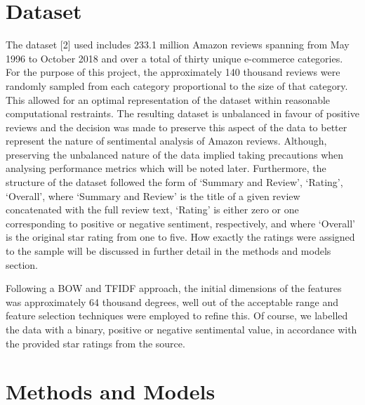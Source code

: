 \documentclass[conference]{IEEEtran}
\begin{document}
\section{Dataset}

	The dataset [2] used includes 233.1 million Amazon reviews spanning from May 1996 to October 2018 and over a total of thirty unique e-commerce categories. For the purpose of this project, the approximately 140 thousand reviews were randomly sampled from each category proportional to the size of that category. This allowed for an optimal representation of the dataset within reasonable computational restraints. The resulting dataset is unbalanced in favour of positive reviews and the decision was made to preserve this aspect of the data to better represent the nature of sentimental analysis of Amazon reviews. Although, preserving the unbalanced nature of the data implied taking precautions when analysing performance metrics which will be noted later. Furthermore, the structure of the dataset followed the form of {‘Summary and Review’, ‘Rating’, ‘Overall’}, where ‘Summary and Review’ is the title of a given review concatenated with the full review text, ‘Rating’ is either zero or one corresponding to positive or negative sentiment, respectively, and where ‘Overall’ is the original star rating from one to five. How exactly the ratings were assigned to the sample will be discussed in further detail in the methods and models section.

	Following a BOW and TFIDF approach, the initial dimensions of the features was approximately 64 thousand degrees, well out of the acceptable range and feature selection techniques were employed to refine this. Of course, we labelled the data with a binary, positive or negative sentimental value, in accordance with the provided star ratings from the source.


\section{Methods and Models}
\end{document}
